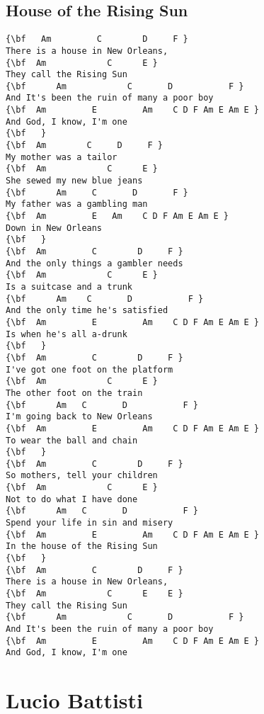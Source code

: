 \documentclass[a4paper]{article}
\begin{document}
\subsection{House of the Rising Sun}
\begin{multicols}{2}\begin{Verbatim}[commandchars=\\\{\}]
{\bf   Am         C        D     F }
There is a house in New Orleans, 
{\bf  Am            C      E }
They call the Rising Sun 
{\bf      Am            C       D           F }
And It's been the ruin of many a poor boy 
{\bf  Am         E         Am    C D F Am E Am E }
And God, I know, I'm one 
{\bf   }
{\bf  Am        C     D     F }
My mother was a tailor 
{\bf  Am            C      E }
She sewed my new blue jeans 
{\bf      Am     C       D       F }
My father was a gambling man 
{\bf  Am         E   Am    C D F Am E Am E }
Down in New Orleans 
{\bf   }
{\bf  Am         C        D     F }
And the only things a gambler needs 
{\bf  Am            C      E }
Is a suitcase and a trunk 
{\bf      Am    C       D           F }
And the only time he's satisfied 
{\bf  Am         E         Am    C D F Am E Am E }
Is when he's all a-drunk 
{\bf   }
{\bf  Am         C        D     F }
I've got one foot on the platform 
{\bf  Am            C      E }
The other foot on the train 
{\bf      Am   C       D           F }
I'm going back to New Orleans 
{\bf  Am         E         Am    C D F Am E Am E }
To wear the ball and chain 
{\bf   }
{\bf  Am         C        D     F }
So mothers, tell your children 
{\bf  Am            C      E }
Not to do what I have done 
{\bf      Am   C       D           F }
Spend your life in sin and misery 
{\bf  Am         E         Am    C D F Am E Am E }
In the house of the Rising Sun 
{\bf   }
{\bf  Am         C        D     F }
There is a house in New Orleans, 
{\bf  Am            C      E    E }
They call the Rising Sun 
{\bf      Am            C       D           F }
And It's been the ruin of many a poor boy 
{\bf  Am         E         Am    C D F Am E Am E }
And God, I know, I'm one 

\end{Verbatim}
\end{multicols}\newpage
\section{Lucio Battisti}
\end{document}

